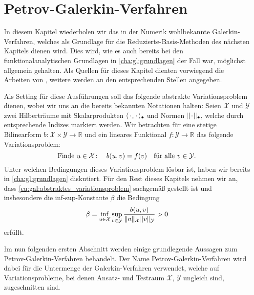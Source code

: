 
\iftoggle{dictum}{
    \setchapterpreamble[ul][0.6\textwidth]{%
        \dictum[Alfréd Rényi]{\enquote{A mathematician is a device for turning coffee into theorems.}}
        \vspace*{2\baselineskip}
    }
}{}
\chapter{Petrov-Galerkin-Verfahren} %
\label{cha:grb:galerkin_und_reduzierte_basis}

In diesem Kapitel wiederholen wir das in der Numerik wohlbekannte Galerkin-Verfahren, welches als Grundlage für die Reduzierte-Basis-Methoden des nächsten Kapitels dienen wird.
Dies wird, wie es auch bereits bei den funktionalanalytischen Grundlagen in \cref{cha:gl:grundlagen} der Fall war, möglichst allgemein gehalten.
Als Quellen für dieses Kapitel dienten vorwiegend die Arbeiten von \textcite{Braess:2007wm,Patera:2007un,Quarteroni:2011jm}, weitere werden an den entsprechenden Stellen angegeben.

Als Setting für diese Ausführungen soll das folgende abstrakte Variationsproblem dienen, wobei wir uns an die bereits bekannten Notationen halten: Seien $\mathcal X$ und $\mathcal Y$ zwei Hilberträume mit Skalarprodukten $\langle{\mkern2mu\cdot\mkern2mu},{\mkern2mu\cdot\mkern2mu}\rangle_{\bullet}$ und Normen $\lVert{\mkern2mu\cdot\mkern2mu}\rVert_{\bullet}$, welche durch entsprechende Indizes markiert werden.
Wir betrachten für eine stetige Bilinearform $b \colon \mathcal X \times \mathcal Y \to \mathbb{R}$ und ein lineares Funktional $f \colon \mathcal Y \to \mathbb{R}$ das folgende Variationsproblem:
\begin{equation}
    \label{eq:gal:abstraktes_variationsproblem}
    \text{Finde}~u \in \mathcal X \colon \quad  b(u, v) = f(v) \quad \fa v \in \mathcal Y.
\end{equation}
Unter welchen Bedingungen dieses Variationsproblem lösbar ist, haben wir bereits in \cref{cha:gl:grundlagen} diskutiert.
Für den Rest dieses Kapitels nehmen wir an, dass \cref{eq:gal:abstraktes_variationsproblem} sachgemäß gestellt ist und insbesondere die inf-sup-Konstante $\beta$ die Bedingung
\begin{equation}
    \label{eq:gal:abstraktes_variationsproblem_infsup}
    \beta = \inf_{u \in \mathcal X} \sup_{v \in \mathcal Y} \frac{b(u, v)}{\norm{u}_{\mathcal X} \norm{v}_{\mathcal Y}} > 0
\end{equation}
erfüllt.

Im nun folgenden ersten Abschnitt werden einige grundlegende Aussagen zum Petrov-Galerkin-Verfahren behandelt.
Der Name Petrov-Galerkin-Verfahren wird dabei für die Untermenge der Galerkin-Verfahren verwendet, welche auf Variationsprobleme, bei denen Ansatz- und Testraum $\mathcal X$, $\mathcal Y$ ungleich sind, zugeschnitten sind.


